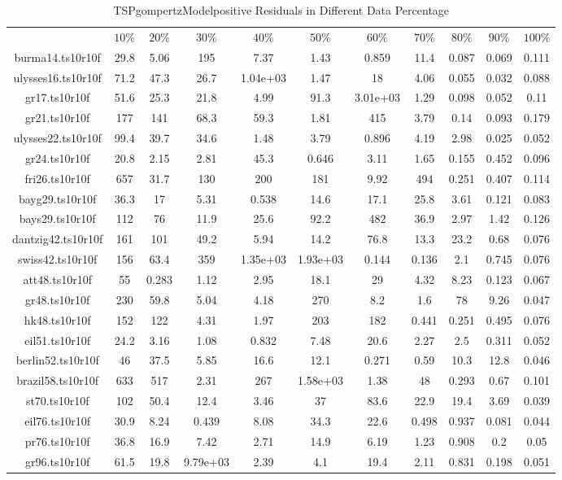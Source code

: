 \begin{table}[htbp]
\caption{TSPgompertzModelpositive Residuals in Different Data Percentage}
\centering
\begin{tabular}{|ccccccccccc|}
\hline
 & $10\%$ & $20\%$ & $30\%$ & $40\%$ & $50\%$ & $60\%$ & $70\%$ & $80\%$ & $90\%$ & $100\%$ \\
burma14.ts10r10f & 29.8 & 5.06 &  195 & 7.37 & 1.43 & 0.859 & 11.4 & 0.087 & 0.069 & 0.111 \\
ulysses16.ts10r10f & 71.2 & 47.3 & 26.7 & 1.04e+03 & 1.47 &   18 & 4.06 & 0.055 & 0.032 & 0.088 \\
gr17.ts10r10f & 51.6 & 25.3 & 21.8 & 4.99 & 91.3 & 3.01e+03 & 1.29 & 0.098 & 0.052 & 0.11 \\
gr21.ts10r10f &  177 &  141 & 68.3 & 59.3 & 1.81 &  415 & 3.79 & 0.14 & 0.093 & 0.179 \\
ulysses22.ts10r10f & 99.4 & 39.7 & 34.6 & 1.48 & 3.79 & 0.896 & 4.19 & 2.98 & 0.025 & 0.052 \\
gr24.ts10r10f & 20.8 & 2.15 & 2.81 & 45.3 & 0.646 & 3.11 & 1.65 & 0.155 & 0.452 & 0.096 \\
fri26.ts10r10f &  657 & 31.7 &  130 &  200 &  181 & 9.92 &  494 & 0.251 & 0.407 & 0.114 \\
bayg29.ts10r10f & 36.3 &   17 & 5.31 & 0.538 & 14.6 & 17.1 & 25.8 & 3.61 & 0.121 & 0.083 \\
bays29.ts10r10f &  112 &   76 & 11.9 & 25.6 & 92.2 &  482 & 36.9 & 2.97 & 1.42 & 0.126 \\
dantzig42.ts10r10f &  161 &  101 & 49.2 & 5.94 & 14.2 & 76.8 & 13.3 & 23.2 & 0.68 & 0.076 \\
swiss42.ts10r10f &  156 & 63.4 &  359 & 1.35e+03 & 1.93e+03 & 0.144 & 0.136 &  2.1 & 0.745 & 0.076 \\
att48.ts10r10f &   55 & 0.283 & 1.12 & 2.95 & 18.1 &   29 & 4.32 & 8.23 & 0.123 & 0.067 \\
gr48.ts10r10f &  230 & 59.8 & 5.04 & 4.18 &  270 &  8.2 &  1.6 &   78 & 9.26 & 0.047 \\
hk48.ts10r10f &  152 &  122 & 4.31 & 1.97 &  203 &  182 & 0.441 & 0.251 & 0.495 & 0.076 \\
eil51.ts10r10f & 24.2 & 3.16 & 1.08 & 0.832 & 7.48 & 20.6 & 2.27 &  2.5 & 0.311 & 0.052 \\
berlin52.ts10r10f &   46 & 37.5 & 5.85 & 16.6 & 12.1 & 0.271 & 0.59 & 10.3 & 12.8 & 0.046 \\
brazil58.ts10r10f &  633 &  517 & 2.31 &  267 & 1.58e+03 & 1.38 &   48 & 0.293 & 0.67 & 0.101 \\
st70.ts10r10f &  102 & 50.4 & 12.4 & 3.46 &   37 & 83.6 & 22.9 & 19.4 & 3.69 & 0.039 \\
eil76.ts10r10f & 30.9 & 8.24 & 0.439 & 8.08 & 34.3 & 22.6 & 0.498 & 0.937 & 0.081 & 0.044 \\
pr76.ts10r10f & 36.8 & 16.9 & 7.42 & 2.71 & 14.9 & 6.19 & 1.23 & 0.908 &  0.2 & 0.05 \\
gr96.ts10r10f & 61.5 & 19.8 & 9.79e+03 & 2.39 &  4.1 & 19.4 & 2.11 & 0.831 & 0.198 & 0.051 \\
\hline
\end{tabular}
\end{table}
